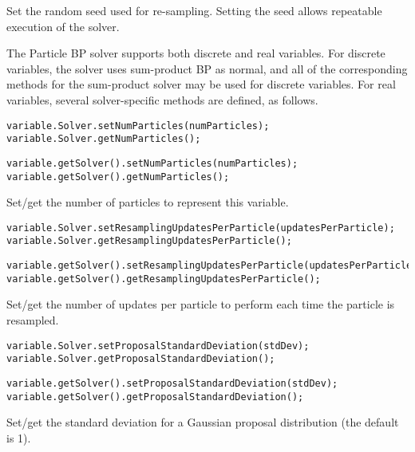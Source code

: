 Set the random seed used for re-sampling. Setting the seed allows repeatable execution of the solver.


The Particle BP solver supports both discrete and real variables. For discrete variables, the solver uses sum-product BP as normal, and all of the corresponding methods for the sum-product solver may be used for discrete variables. For real variables, several solver-specific methods are defined, as follows.

\label{sec:ParticleBPRealVariableSpecificMethods}

\ifmatlab
\begin{lstlisting}
variable.Solver.setNumParticles(numParticles);
variable.Solver.getNumParticles();
\end{lstlisting}
\fi

\ifjava
\begin{lstlisting}
variable.getSolver().setNumParticles(numParticles);
variable.getSolver().getNumParticles();
\end{lstlisting}
\fi

Set/get the number of particles to represent this variable.

\ifmatlab
\begin{lstlisting}
variable.Solver.setResamplingUpdatesPerParticle(updatesPerParticle);
variable.Solver.getResamplingUpdatesPerParticle();
\end{lstlisting}
\fi

\ifjava
\begin{lstlisting}
variable.getSolver().setResamplingUpdatesPerParticle(updatesPerParticle);
variable.getSolver().getResamplingUpdatesPerParticle();
\end{lstlisting}
\fi


Set/get the number of updates per particle to perform each time the particle is resampled.

\ifmatlab
\begin{lstlisting}
variable.Solver.setProposalStandardDeviation(stdDev);
variable.Solver.getProposalStandardDeviation();
\end{lstlisting}
\fi

\ifjava
\begin{lstlisting}
variable.getSolver().setProposalStandardDeviation(stdDev);
variable.getSolver().getProposalStandardDeviation();
\end{lstlisting}
\fi


Set/get the standard deviation for a Gaussian proposal distribution (the default is 1).

